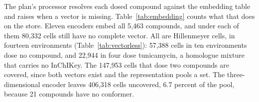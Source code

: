 The plan's processor resolves each dosed compound against the embedding table and raises
when a vector is missing. Table~\ref{tab:embedding} counts what that does on the store.
Eleven encoders embed all 5{,}463 compounds, and under each of them 80{,}332 cells still
have no complete vector. All are Hillenmeyer cells, in fourteen environments
(Table~\ref{tab:vectorless}): 57{,}388 cells in ten environments dose no compound, and
22{,}944 in four dose tunicamycin, a homologue mixture that carries no InChIKey. The
147{,}953 cells that dose two compounds are covered, since both vectors exist and the
representation pools a set. The three-dimensional encoder leaves 406{,}318 cells
uncovered, 6.7 percent of the pool, because 21 compounds have no conformer.

\begin{table}[htbp]
\centering
\footnotesize
\caption{Compound vectors against the store, per encoder. Compounds are distinct
InChIKeys in the pool. A cell is covered when every compound it doses has a vector; the
four right-hand columns are the covered share of each source's cells, in percent.}
\label{tab:embedding}

\end{table}

\begin{table}[htbp]
\centering
\footnotesize
\caption{The fourteen environments no compound vector can describe, all in Hillenmeyer
HET. Ten dose no compound and differ from the source's standard condition in medium or in
temperature; four dose tunicamycin.}
\label{tab:vectorless}

\end{table}
